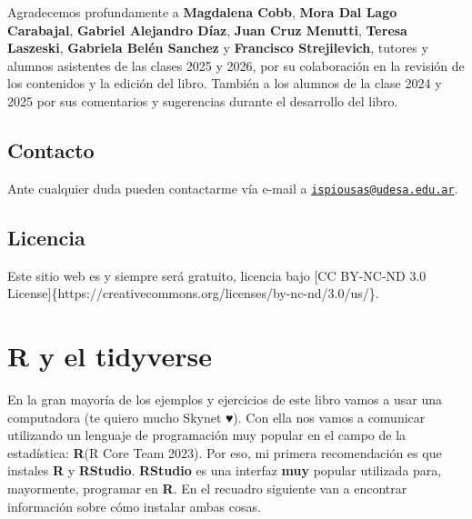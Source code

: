 \documentclass[
  letterpaper,
  DIV=11,
  numbers=noendperiod,
  oneside]{scrreprt}
\begin{document}
Agradecemos profundamente a \textbf{Magdalena Cobb}, \textbf{Mora Dal
Lago Carabajal}, \textbf{Gabriel Alejandro Díaz}, \textbf{Juan Cruz
Menutti}, \textbf{Teresa Laszeski}, \textbf{Gabriela Belén Sanchez} y
\textbf{Francisco Strejilevich}, tutores y alumnos asistentes de las
clases 2025 y 2026, por su colaboración en la revisión de los contenidos
y la edición del libro. También a los alumnos de la clase 2024 y 2025
por sus comentarios y sugerencias durante el desarrollo del libro.

\hypertarget{contacto}{%
\section*{Contacto}\label{contacto}}

Ante cualquier duda pueden contactarme vía e-mail a
\href{mailto:ispiousas@udesa.edu.ar}{\nolinkurl{ispiousas@udesa.edu.ar}}.

\hypertarget{licencia}{%
\section*{Licencia}\label{licencia}}

Este sitio web es y siempre será gratuito, licencia bajo {[}CC BY-NC-ND
3.0 License{]}\{https://creativecommons.org/licenses/by-nc-nd/3.0/us/\}.


\hypertarget{sec-intro_R}{%
\chapter{R y el tidyverse}\label{sec-intro_R}}

En la gran mayoría de los ejemplos y ejercicios de este libro vamos a
usar una computadora (te quiero mucho Skynet ♥️). Con ella nos vamos a
comunicar utilizando un lenguaje de programación muy popular en el campo
de la estadística: \textbf{R}(R Core Team
2023).
Por eso, mi primera recomendación es que instales \textbf{R} y
\textbf{RStudio}. \textbf{RStudio} es una interfaz \textbf{muy} popular
utilizada para, mayormente, programar en \textbf{R}. En el
recuadro siguiente van a encontrar información sobre cómo instalar ambas
cosas.
\end{document}
